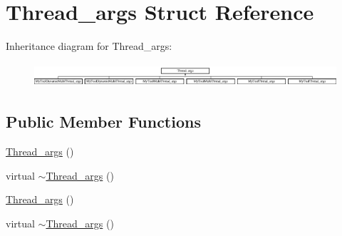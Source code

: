 \hypertarget{structThread__args}{\section{Thread\-\_\-args Struct Reference}
\label{structThread__args}
}
Inheritance diagram for Thread\-\_\-args\-:\begin{figure}[H]
\begin{center}
\leavevmode
\includegraphics[height=0.888889cm]{structThread__args}
\end{center}
\end{figure}
\subsection*{Public Member Functions}
\begin{DoxyCompactItemize}
\item 
\hyperlink{structThread__args_a399b672e0f4f137fe52c141bd8c38eb1}{Thread\-\_\-args} ()
\item 
virtual \hyperlink{structThread__args_ad786e0c55b4e44bc04d9ba3b813bace1}{$\sim$\-Thread\-\_\-args} ()
\item 
\hyperlink{structThread__args_a399b672e0f4f137fe52c141bd8c38eb1}{Thread\-\_\-args} ()
\item 
virtual \hyperlink{structThread__args_ad786e0c55b4e44bc04d9ba3b813bace1}{$\sim$\-Thread\-\_\-args} ()
\end{DoxyCompactItemize}
